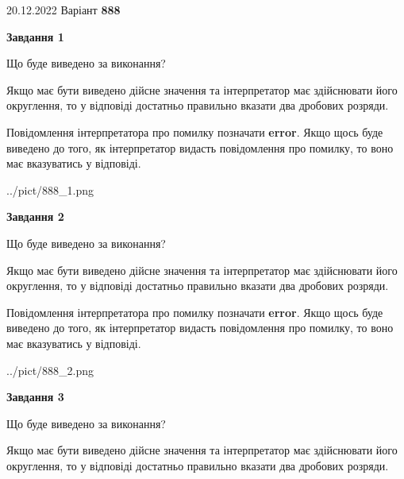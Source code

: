 \documentclass[12pt, ukrainian]{article}
\begin{document}
{20.12.2022 Варіант \No \textbf { 888 }\par}
{
\begin {Large}

{\begin {center}\textbf{Завдання 1}\end {center}}\par
Що буде виведено за виконання? \par

Якщо має бути виведено дійсне значення та інтерпретатор має здійснювати його округлення, 
то у відповіді достатньо правильно вказати два дробових розряди.

Повідомлення інтерпретатора про помилку позначати \textbf{error}.
Якщо щось буде виведено до того, як інтерпретатор видасть повідомлення про помилку, 
то воно має вказуватись у відповіді. \par

\begin{center}
	{../pict/888_1.png}
\end{center}
\newpage

{\begin {center}\textbf{Завдання 2}\end {center}}\par
Що буде виведено за виконання? \par

Якщо має бути виведено дійсне значення та інтерпретатор має здійснювати його округлення, 
то у відповіді достатньо правильно вказати два дробових розряди.

Повідомлення інтерпретатора про помилку позначати \textbf{error}.
Якщо щось буде виведено до того, як інтерпретатор видасть повідомлення про помилку, 
то воно має вказуватись у відповіді. \par

\begin{center}
	{../pict/888_2.png}
\end{center}
\newpage

{\begin {center}\textbf{Завдання 3}\end {center}}\par
Що буде виведено за виконання? \par

Якщо має бути виведено дійсне значення та інтерпретатор має здійснювати його округлення, 
то у відповіді достатньо правильно вказати два дробових розряди.


\end{Large}}
\end{document}
